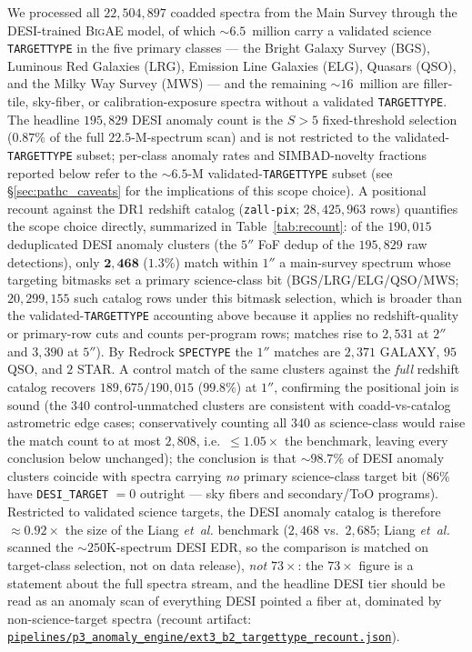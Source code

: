 \documentclass[aps,prd,twocolumn,superscriptaddress,showpacs,preprintnumbers,nofootinbib,longbibliography,floatfix]{revtex4-2}
\newcommand{\repoBase}{https://github.com/Hubify-Projects/bigbounce/blob/main}
\newcommand{\artifact}[1]{\href{\repoBase/#1}{\nolinkurl{#1}}}
\newcommand{\etal}{\textit{et~al.}}
\newcommand{\BigAE}{\textsc{BigAE}}
\begin{document}
We processed all $22{,}504{,}897$ coadded spectra from the Main Survey through the DESI-trained \BigAE{} model, of which ${\sim}6.5$~million carry a validated science \texttt{TARGETTYPE} in the five primary classes --- the Bright Galaxy Survey (BGS), Luminous Red Galaxies (LRG), Emission Line Galaxies (ELG), Quasars (QSO), and the Milky Way Survey (MWS) --- and the remaining ${\sim}16$~million are filler-tile, sky-fiber, or calibration-exposure spectra without a validated \texttt{TARGETTYPE}. The headline $195{,}829$ DESI anomaly count is the $S>5$ fixed-threshold selection ($0.87\%$ of the full $22.5$-M-spectrum scan) and is not restricted to the validated-\texttt{TARGETTYPE} subset; per-class anomaly rates and SIMBAD-novelty fractions reported below refer to the ${\sim}6.5$-M validated-\texttt{TARGETTYPE} subset (see \S\ref{sec:pathc_caveats} for the implications of this scope choice). A positional recount against the DR1 redshift catalog (\texttt{zall-pix}; $28{,}425{,}963$ rows) quantifies the scope choice directly, summarized in Table~\ref{tab:recount}: of the $190{,}015$ deduplicated DESI anomaly clusters (the $5''$ FoF dedup of the $195{,}829$ raw detections), only $\mathbf{2{,}468}$ ($1.3\%$) match within $1''$ a main-survey spectrum whose targeting bitmasks set a primary science-class bit (BGS/LRG/ELG/QSO/MWS; $20{,}299{,}155$ such catalog rows under this bitmask selection, which is broader than the validated-\texttt{TARGETTYPE} accounting above because it applies no redshift-quality or primary-row cuts and counts per-program rows; matches rise to $2{,}531$ at $2''$ and $3{,}390$ at $5''$). By Redrock \texttt{SPECTYPE} the $1''$ matches are $2{,}371$ GALAXY, $95$ QSO, and $2$ STAR. A control match of the same clusters against the \emph{full} redshift catalog recovers $189{,}675/190{,}015$ ($99.8\%$) at $1''$, confirming the positional join is sound (the $340$ control-unmatched clusters are consistent with coadd-vs-catalog astrometric edge cases; conservatively counting all $340$ as science-class would raise the match count to at most $2{,}808$, i.e.\ $\leq\!1.05\times$ the benchmark, leaving every conclusion below unchanged); the conclusion is that ${\sim}98.7\%$ of DESI anomaly clusters coincide with spectra carrying \emph{no} primary science-class target bit ($86\%$ have \texttt{DESI\_TARGET} $=0$ outright --- sky fibers and secondary/ToO programs). Restricted to validated science targets, the DESI anomaly catalog is therefore $\approx\!0.92\times$ the size of the Liang \etal{} benchmark ($2{,}468$ vs.\ $2{,}685$; Liang \etal{} scanned the ${\sim}250$K-spectrum DESI EDR, so the comparison is matched on target-class selection, not on data release), \emph{not} $73\times$: the $73\times$ figure is a statement about the full spectra stream, and the headline DESI tier should be read as an anomaly scan of everything DESI pointed a fiber at, dominated by non-science-target spectra (recount artifact: \artifact{pipelines/p3\_anomaly\_engine/ext3\_b2\_targettype\_recount.json}).
\end{document}
